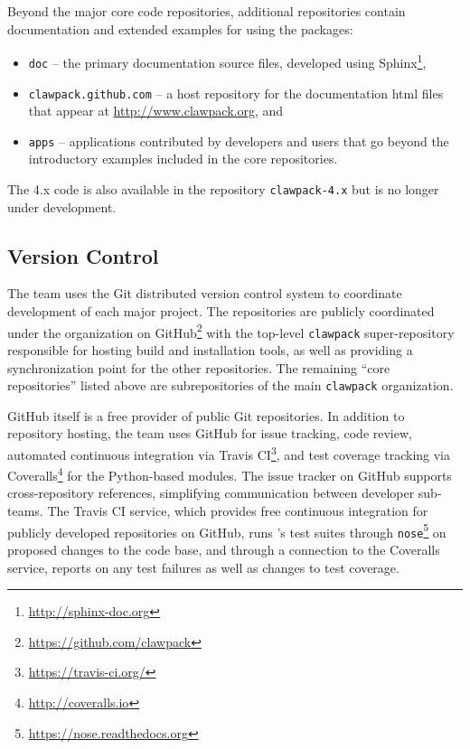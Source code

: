 Beyond the major core code repositories, additional repositories contain
documentation and extended examples for using the packages:
\begin{itemize}
    \item \texttt{doc} -- the primary documentation source files,
    developed using Sphinx\footnote{\url{http://sphinx-doc.org}},
    \item \texttt{clawpack.github.com} -- a host repository for the
    documentation html files
    that appear at \url{http://www.clawpack.org}, and
    \item \texttt{apps} -- applications contributed by developers and
    users that go beyond the introductory examples included in the core
    repositories.
\end{itemize}
The \clawpack 4.x code is also available in the repository \texttt{clawpack-4.x}
but is no longer under development.


\subsection{Version Control}

The \clawpack team uses the Git distributed version control system
to coordinate development of each major project.  The repositories are
publicly coordinated under the \clawpack organization on
GitHub\footnote{\url{https://github.com/clawpack}} with the
top-level \texttt{clawpack} super-repository responsible for hosting
build and installation tools, as well as providing a synchronization
point for the other repositories.  The remaining ``core \clawpack repositories''
listed above are subrepositories of the main \texttt{clawpack} organization.

GitHub itself is a free provider of public Git repositories.  In addition to
repository hosting, the \clawpack team uses GitHub for issue tracking,
code review, automated continuous integration via Travis CI\footnote{\url{https://travis-ci.org/}},
and test coverage tracking via Coveralls\footnote{\url{http://coveralls.io}}
for the Python-based modules.  The issue tracker on
GitHub supports cross-repository references,
simplifying communication between \clawpack developer sub-teams.  The
Travis CI service, which provides free continuous integration for
publicly developed repositories on GitHub, runs \clawpack's test
suites through \texttt{nose}\footnote{\url{https://nose.readthedocs.org}}
on proposed changes
to the code base, and through a connection to the Coveralls service,
reports on any test failures as well as changes to test coverage.

